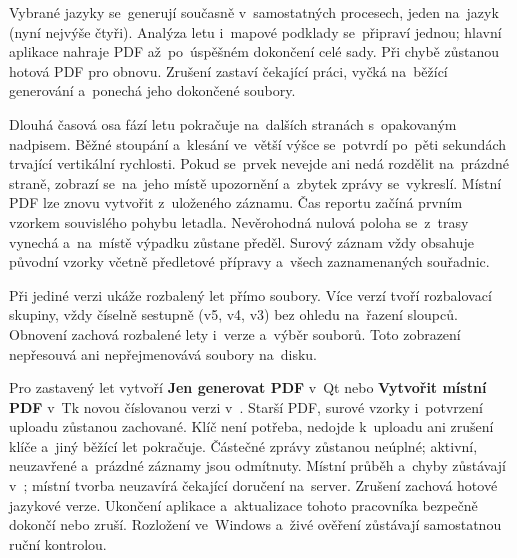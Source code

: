 \documentclass[11pt,a4paper]{article}
\newcommand{\filepath}[1]{\path{#1}}
\newcommand{\ui}[1]{\textbf{#1}}
\begin{document}
Vybrané jazyky se~generují současně v~samostatných procesech, jeden na~jazyk
(nyní nejvýše čtyři). Analýza letu i~mapové podklady se~připraví jednou;
hlavní aplikace nahraje PDF až~po~úspěšném dokončení celé sady. Při chybě
zůstanou hotová PDF pro obnovu. Zrušení zastaví čekající práci, vyčká
na~běžící generování a~ponechá jeho dokončené soubory.

Dlouhá časová osa fází letu pokračuje na~dalších stranách s~opakovaným
nadpisem. Běžné stoupání a~klesání ve~větší výšce se~potvrdí po~pěti sekundách
trvající vertikální rychlosti. Pokud se~prvek nevejde ani nedá
rozdělit na~prázdné straně, zobrazí se~na~jeho místě upozornění a~zbytek
zprávy se~vykreslí. Místní PDF lze znovu vytvořit z~uloženého záznamu.
Čas reportu začíná prvním vzorkem souvislého pohybu letadla. Nevěrohodná
nulová poloha se~z~trasy vynechá a~na~místě výpadku zůstane předěl.
Surový záznam vždy obsahuje původní vzorky včetně předletové přípravy
a~všech zaznamenaných souřadnic.

Při jediné verzi ukáže rozbalený let přímo soubory. Více verzí tvoří
rozbalovací skupiny, vždy číselně sestupně (v5, v4, v3) bez ohledu na~řazení
sloupců. Obnovení zachová rozbalené lety i~verze a~výběr souborů. Toto
zobrazení nepřesouvá ani nepřejmenovává soubory na~disku.

Pro zastavený let vytvoří \ui{Jen generovat PDF} v~Qt nebo
\ui{Vytvořit místní PDF} v~Tk
novou číslovanou verzi v~\filepath{reports/}. Starší PDF, surové
vzorky i~potvrzení uploadu zůstanou zachované. Klíč není potřeba, nedojde
k~uploadu ani zrušení klíče a~jiný běžící let pokračuje. Částečné zprávy
zůstanou neúplné; aktivní, neuzavřené a~prázdné záznamy jsou odmítnuty.
Místní průběh a~chyby zůstávají v~\filepath{manual-report.json}; místní tvorba
neuzavírá čekající doručení na~server. Zrušení zachová hotové jazykové verze.
Ukončení aplikace a~aktualizace tohoto pracovníka bezpečně dokončí nebo zruší.
Rozložení ve~Windows a~živé ověření zůstávají samostatnou ruční kontrolou.
\end{document}

